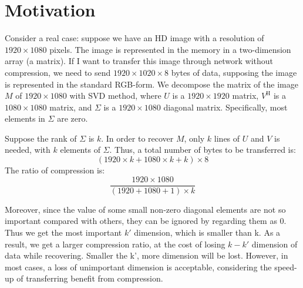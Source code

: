 \documentclass{article}
\begin{document}
    \section{Motivation}
        \par
        Consider a real case:
        suppose we have an HD image with a resolution of $1920 \times 1080$ pixels.
        The image is represented in the memory in a two-dimension array (a matrix).
        If I want to transfer this image through network without compression,
        we need to send $1920 \times 1020 \times 8$ bytes of data,
        supposing the image is represented in the standard RGB-form.
        We decompose the matrix of the image $M$ of $1920 \times 1080$ with SVD method,
        where $U$ is a $1920 \times 1920$ matrix,
        $V^\mathrm{ H }$ is a $1080 \times 1080$ matrix,
        and $\Sigma$ is a $1920 \times 1080$ diagonal matrix.
        Specifically, most elements in $\Sigma$ are zero.
        \par
        Suppose the rank of $\Sigma$ is $k$.
        In order to recover $M$, only $k$ lines of $U$ and $V$ is needed,
        with $k$ elements of $\Sigma$.
        Thus, a total number of bytes to be
        transferred is: $$(1920 \times k + 1080 \times k + k) \times 8$$
        The ratio of compression is: $$\frac{1920 \times 1080}{(1920 + 1080 + 1) \times k} $$
        \par
        Moreover, since the value of some small non-zero diagonal elements are not so important
        compared with others, they can be ignored by regarding them as 0.
        Thus we get the most important $k'$ dimension, which is smaller than k.
        As a result, we get a larger compression ratio,
        at the cost of losing $k - k'$ dimension of data while recovering.
        Smaller the k’, more dimension will be lost.
        However, in most cases, a loss of unimportant dimension is acceptable,
        considering the speed-up of transferring benefit from compression.
    
\end{document}
